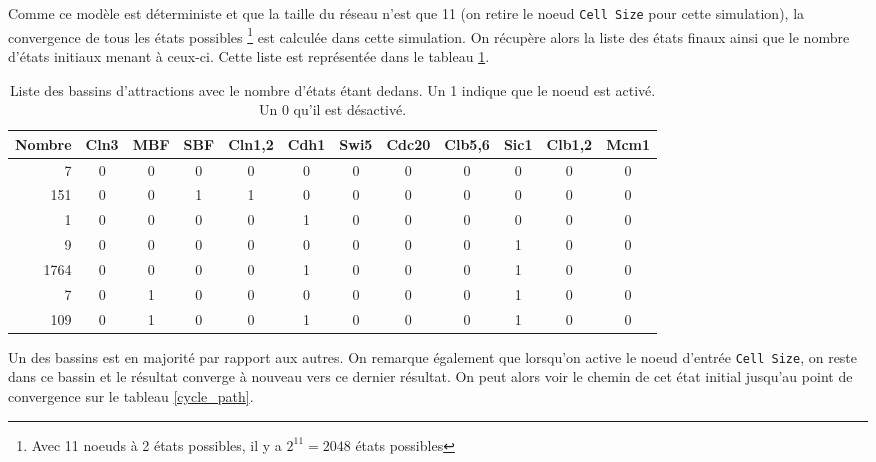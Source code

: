 \documentclass[11pt, a4paper]{article}
\begin{document}
Comme ce modèle est déterministe et que la taille du réseau n'est que 11 (on
retire le noeud \texttt{Cell Size} pour cette simulation), la convergence de
tous les états possibles \footnote{Avec 11 noeuds à 2 états possibles, il y a
$2^{11} = 2048$ états possibles} est calculée dans cette simulation. On
récupère alors la liste des états finaux ainsi que le nombre d'états initiaux
menant à ceux-ci. Cette liste est représentée dans le tableau
\ref{table_yeast}.

\begin{center}
    \begin{table}
        \caption{
            \label{table_yeast}
            Liste des bassins d'attractions avec le nombre d'états étant
            dedans. Un 1 indique que le noeud est activé. Un 0 qu'il est
            désactivé.
        }
        \small
        \begin{tabular}{r | c c c c c c c c c c c}
            Nombre & Cln3 & MBF & SBF & Cln1,2 & Cdh1 & Swi5 & Cdc20 & Clb5,6 &
            Sic1 & Clb1,2 & Mcm1 \\
            \hline
            7       & 0 & 0 & 0 & 0 & 0 & 0 & 0 & 0 & 0 & 0 & 0 \\
            151     & 0 & 0 & 1 & 1 & 0 & 0 & 0 & 0 & 0 & 0 & 0 \\
            1       & 0 & 0 & 0 & 0 & 1 & 0 & 0 & 0 & 0 & 0 & 0 \\
            9       & 0 & 0 & 0 & 0 & 0 & 0 & 0 & 0 & 1 & 0 & 0 \\
            1764    & 0 & 0 & 0 & 0 & 1 & 0 & 0 & 0 & 1 & 0 & 0 \\
            7       & 0 & 1 & 0 & 0 & 0 & 0 & 0 & 0 & 1 & 0 & 0 \\
            109     & 0 & 1 & 0 & 0 & 1 & 0 & 0 & 0 & 1 & 0 & 0 \\
        \end{tabular}
        \normalsize
    \end{table}
\end{center}

Un des bassins est en majorité par rapport aux autres. On remarque également
que lorsqu'on active le noeud d'entrée \texttt{Cell Size}, on reste dans ce
bassin et le résultat converge à nouveau vers ce dernier résultat. On peut
alors voir le chemin de cet état initial jusqu'au point de convergence sur le
tableau \ref{cycle_path}.
\end{document}
